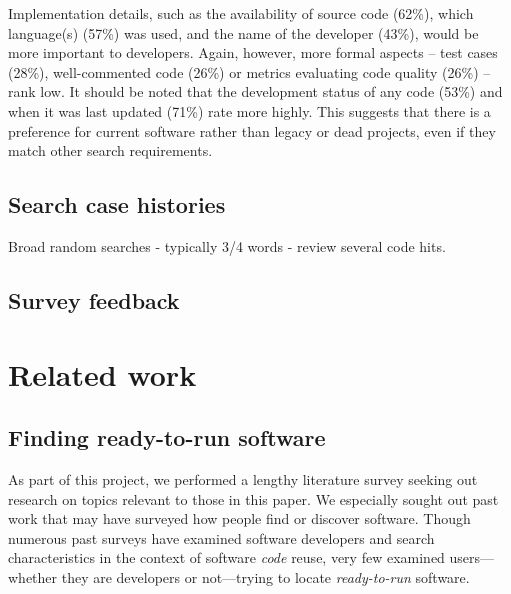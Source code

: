 \documentclass{casicswhitepaper}
\begin{document}
Implementation details, such as the availability of source code (62\%), which language(s) (57\%) was used, and the name of the developer (43\%), would be more important to developers. Again, however, more formal aspects -- test cases (28\%), well-commented code (26\%) or metrics evaluating code quality (26\%) -- rank low. It should be noted that the development status of any code (53\%) and when it was last updated (71\%) rate more highly. This suggests that there is a preference for current software rather than legacy or dead projects, even if they match other search requirements.

\subsection{Search case histories}

Broad random searches - typically 3/4 words - review several code hits. 

\subsection{Survey feedback}


\section{Related work}

\subsection{Finding ready-to-run software}

As part of this project, we performed a lengthy literature survey seeking out research on topics relevant to those in this paper.  We especially sought out past work that may have surveyed how people find or discover software.  Though numerous past surveys have examined software developers and search characteristics in the context of software \emph{code} reuse, very few examined users---whether they are developers or not---trying to locate \emph{ready-to-run} software.
\end{document}
